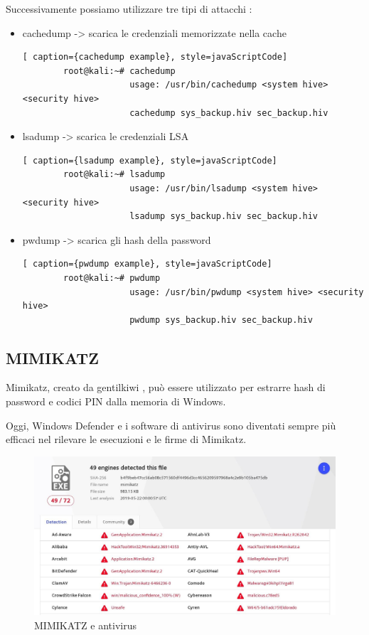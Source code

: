Successivamente possiamo utilizzare tre tipi di attacchi :
\begin{itemize}
    \item cachedump -> scarica le credenziali memorizzate nella cache
          \begin{lstlisting}[ caption={cachedump example}, style=javaScriptCode]
        root@kali:~# cachedump
                     usage: /usr/bin/cachedump <system hive> <security hive>
                     cachedump sys_backup.hiv sec_backup.hiv
    \end{lstlisting}
    \item lsadump -> scarica le credenziali LSA
          \begin{lstlisting}[ caption={lsadump example}, style=javaScriptCode]
        root@kali:~# lsadump
                     usage: /usr/bin/lsadump <system hive> <security hive>
                     lsadump sys_backup.hiv sec_backup.hiv
    \end{lstlisting}
    \item pwdump -> scarica gli hash della password
          \begin{lstlisting}[ caption={pwdump example}, style=javaScriptCode]
        root@kali:~# pwdump 
                     usage: /usr/bin/pwdump <system hive> <security hive>
                     pwdump sys_backup.hiv sec_backup.hiv 
    \end{lstlisting}
\end{itemize}

\subsection{MIMIKATZ}

Mimikatz\cite{MIMIKATZ}, creato da gentilkiwi , può essere utilizzato per estrarre hash di password e codici PIN dalla memoria di Windows.

Oggi, Windows Defender e i software di antivirus sono diventati sempre più efficaci nel rilevare le esecuzioni e le firme di Mimikatz.


\begin{figure}[h!]
    \centering
    \includegraphics[width=120mm]{Immagini/2/mimikatz.jpg}
    \caption{MIMIKATZ e antivirus}
    \label{fig:MIMIKATZ}
\end{figure}

